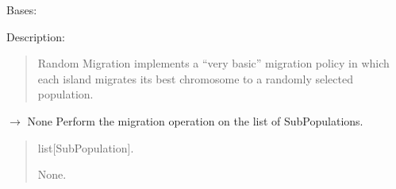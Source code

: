 \documentclass[letterpaper,10pt,english]{sphinxmanual}
\begin{document}
\begin{fulllineitems}
\label{\detokenize{pygenalgo.operators.migration:pygenalgo.operators.migration.random_migration.RandomMigration}}
\pysigstartsignatures
\pysiglinewithargsret
{}
{}
{}
\pysigstopsignatures
\sphinxAtStartPar
Bases: {\hyperref[\detokenize{pygenalgo.operators.migration:pygenalgo.operators.migration.migration_operator.MigrationOperator}]{}}

\sphinxAtStartPar
Description:
\begin{quote}

\sphinxAtStartPar
Random Migration implements a “very basic” migration policy in which
each island migrates its best chromosome to a randomly selected population.
\end{quote}

\begin{fulllineitems}
\label{\detokenize{pygenalgo.operators.migration:pygenalgo.operators.migration.random_migration.RandomMigration.migrate}}
\pysigstartsignatures
\pysiglinewithargsret
{}
{}
{{ $\rightarrow$ None}}
\pysigstopsignatures
\sphinxAtStartPar
Perform the migration operation on the list of SubPopulations.
\begin{quote}\begin{description}
\sphinxAtStartPar
{} \textendash{} list{[}SubPopulation{]}.

\sphinxAtStartPar
None.

\end{description}\end{quote}

\end{fulllineitems}


\end{fulllineitems}
\end{document}
